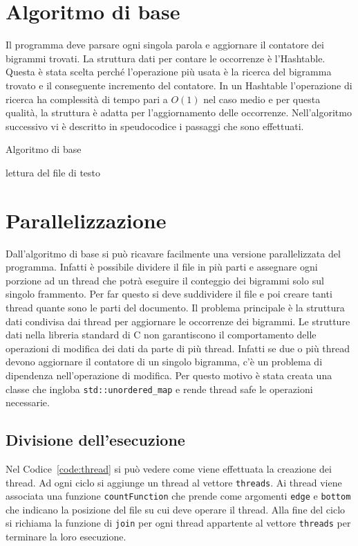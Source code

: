 \documentclass[10pt,twocolumn,letterpaper]{article}
\newcommand{\Rplus}{\protect\hspace{-.1em}\protect\raisebox{.35ex}{\smaller{\smaller\textbf{+}}}}
\newcommand{\CC}{\mbox{C\Rplus\Rplus}\xspace}
\newcommand{\code}[1]{\texttt{#1}}
\begin{document}
\section{Algoritmo di base}
\label{algoritmobase}
Il programma deve parsare ogni singola parola e aggiornare il contatore dei bigrammi trovati.
La struttura dati per contare le occorrenze è l'Hashtable. Questa è stata scelta perché l'operazione più
usata è la ricerca del bigramma trovato e il conseguente incremento del contatore.
In un Hashtable l'operazione di ricerca ha complessità di tempo pari a $O(1)$ nel caso medio e per questa qualità,
la struttura è adatta per l'aggiornamento delle occorrenze.
Nell'algoritmo successivo vi è descritto in speudocodice i passaggi che sono effettuati.
\begin{algorithm}
  \caption{Algoritmo di base}
  \label{alg:algBase}
 lettura del file di testo\;

\end{algorithm}


\section{Parallelizzazione}
Dall'algoritmo di base si può ricavare facilmente una versione parallelizzata del programma.
Infatti è possibile dividere il file in più parti e assegnare ogni porzione ad un thread
che potrà eseguire il conteggio dei bigrammi solo sul singolo frammento.
Per far questo si deve suddividere il file e poi creare tanti thread quante sono le parti del documento.
Il problema principale è la struttura dati condivisa dai thread per aggiornare le occorrenze dei bigrammi.
Le strutture dati nella libreria standard di \CC non garantiscono il comportamento delle operazioni di modifica dei dati
da parte di più thread. Infatti se due o più thread devono aggiornare il contatore di un singolo bigramma, c'è un
problema di dipendenza nell'operazione di modifica.
Per questo motivo è stata creata una classe che ingloba \code{std::unordered\_map} e rende thread safe
le operazioni necessarie.
\subsection{Divisione dell'esecuzione}
Nel Codice~\ref{code:thread} si può vedere come viene effettuata la creazione dei thread. Ad ogni ciclo si
aggiunge un thread al vettore \code{threads}. Ai thread viene associata una funzione \code{countFunction} che prende come argomenti
\code{edge} e \code{bottom} che indicano la posizione del file su cui deve operare il thread.
Alla fine del ciclo si richiama la funzione di \code{join} per ogni thread appartente al vettore \code{threads} per terminare la loro esecuzione.
\end{document}
